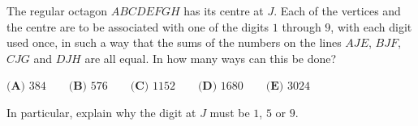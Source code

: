 The regular octagon $ABCDEFGH$ has its centre at $J$. Each of the vertices and the centre are to be associated with one of the digits $1$ through $9$, with each digit used once, in such a way that the sums of the numbers on the lines $AJE$, $BJF$, $CJG$ and $DJH$ are all equal. In how many ways can this be done?

$\textbf{(A) }384\qquad\textbf{(B) }576\qquad\textbf{(C) }1152\qquad\textbf{(D) }1680\qquad\textbf{(E) }3024$

In particular, explain why the digit at $J$ must be $1$, $5$ or $9$.
